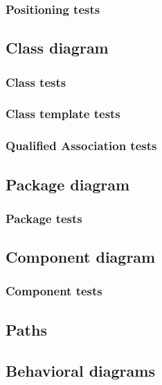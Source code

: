   \subsubsection{Positioning tests}

\subsection{Class diagram}
  \subsubsection{Class tests}
    
  \subsubsection{Class template tests}

  \subsubsection{Qualified Association tests}
    
\subsection{Package diagram}
\subsubsection{Package tests}

\subsection{Component diagram}
\subsubsection{Component tests}

\subsection{Paths}

\subsection{Behavioral diagrams}
